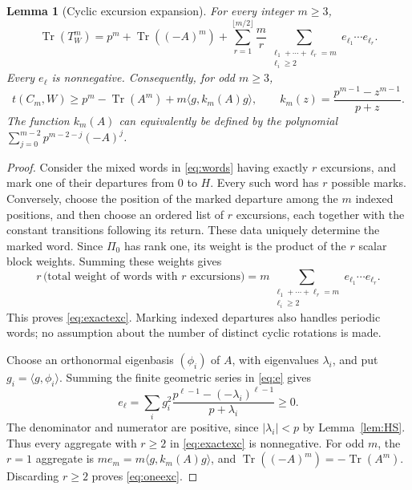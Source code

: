 \documentclass[11pt]{article}
\numberwithin{equation}{section}
\newtheorem{lemma}[theorem]{Lemma}
\theoremstyle{remark}
\newcommand{\Tr}{\operatorname{Tr}}
\newcommand{\ip}[2]{\langle #1,#2\rangle}
\begin{document}
\begin{lemma}[Cyclic excursion expansion]\label{lem:exc}
For every integer $m\ge3$,
\begin{equation}\label{eq:exactexc}
 \Tr(T_W^m)=p^m+\Tr((-A)^m)
 +\sum_{r=1}^{\lfloor m/2\rfloor}\frac mr
 \sum_{\substack{\ell_1+\cdots+\ell_r=m\\\ell_i\ge2}}
 e_{\ell_1}\cdots e_{\ell_r}.
\end{equation}
Every $e_\ell$ is nonnegative. Consequently, for odd $m\ge3$,
\begin{equation}\label{eq:oneexc}
 t(C_m,W)\ge p^m-\Tr(A^m)+m\ip{g}{k_m(A)g},
 \qquad k_m(z)=\frac{p^{m-1}-z^{m-1}}{p+z}.
\end{equation}
The function $k_m(A)$ can equivalently be defined by the polynomial
$\sum_{j=0}^{m-2}p^{m-2-j}(-A)^j$.
\end{lemma}
\begin{proof}
Consider the mixed words in \eqref{eq:words} having exactly $r$ excursions, and mark one of their departures from $0$ to $H$. Every such word has $r$ possible marks. Conversely, choose the position of the marked departure among the $m$ indexed positions, and then choose an ordered list of $r$ excursions, each together with the constant transitions following its return. These data uniquely determine the marked word. Since $\Pi_0$ has rank one, its weight is the product of the $r$ scalar block weights. Summing these weights gives
\[
 r\,\bigl(\text{total weight of words with $r$ excursions}\bigr)
 =m\sum_{\substack{\ell_1+\cdots+\ell_r=m\\\ell_i\ge2}}
 e_{\ell_1}\cdots e_{\ell_r}.
\]
This proves \eqref{eq:exactexc}. Marking indexed departures also handles periodic words; no assumption about the number of distinct cyclic rotations is made.

Choose an orthonormal eigenbasis $(\phi_i)$ of $A$, with eigenvalues $\lambda_i$, and put $g_i=\ip g{\phi_i}$. Summing the finite geometric series in \eqref{eq:e} gives
\begin{equation}\label{eq:epos}
 e_\ell=\sum_i g_i^2\frac{p^{\ell-1}-(-\lambda_i)^{\ell-1}}{p+\lambda_i}\ge0.
\end{equation}
The denominator and numerator are positive, since $|\lambda_i|<p$ by Lemma~\ref{lem:HS}. Thus every aggregate with $r\ge2$ in \eqref{eq:exactexc} is nonnegative. For odd $m$, the $r=1$ aggregate is $m e_m=m\ip g{k_m(A)g}$, and $\Tr((-A)^m)=-\Tr(A^m)$. Discarding $r\ge2$ proves \eqref{eq:oneexc}.
\end{proof}
\end{document}
